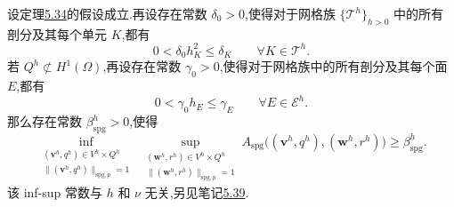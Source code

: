 \begin{lemma}\label{lem:oseen-spg-discrete-infsup}
设定理\hyperref[thm:oseen-spg-existence-uniqueness]{5.34}的假设成立.再设存在常数 $\delta_0>0$,使得对于网格族 $\{\mathcal{T}^h\}_{h>0}$ 中的所有剖分及其每个单元 $K$,都有
\begin{equation}\label{eq:oseen-spg-delta-lower-bound}
  0<\delta_0 h_K^2\le\delta_K
  \qquad\forall K\in\mathcal{T}^h.
\end{equation}
若 $Q^h\not\subset H^1(\Omega)$,再设存在常数 $\gamma_0>0$,使得对于网格族中的所有剖分及其每个面 $E$,都有
\begin{equation}\label{eq:oseen-spg-gamma-lower-bound}
  0<\gamma_0 h_E\le\gamma_E
  \qquad\forall E\in\mathcal{E}^h.
\end{equation}
那么存在常数 $\beta_{\mathrm{spg}}^h>0$,使得
\begin{equation}\label{eq:oseen-spg-discrete-infsup}
 \inf_{\substack{(\bm{v}^h,q^h)\in V^h\times Q^h\\
                  \|(\bm{v}^h,q^h)\|_{\mathrm{spg},p}=1}}
 \ \sup_{\substack{(\bm{w}^h,r^h)\in V^h\times Q^h\\
                  \|(\bm{w}^h,r^h)\|_{\mathrm{spg},p}=1}}
 A_{\mathrm{spg}}\bigl((\bm{v}^h,q^h),(\bm{w}^h,r^h)\bigr)
 \ge\beta_{\mathrm{spg}}^h .
\end{equation}
该 inf-sup 常数与 $h$ 和 $\nu$ 无关,另见笔记\hyperref[note:oseen-spg-infsup-constant]{5.39}.
\end{lemma}
